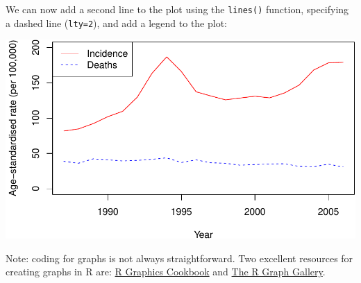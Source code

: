 \documentclass[
]{memoir}
\newenvironment{Shaded}{\begin{snugshade}}{\end{snugshade}}
\newcommand{\AttributeTok}[1]{\textcolor[rgb]{0.77,0.63,0.00}{#1}}
\newcommand{\DecValTok}[1]{\textcolor[rgb]{0.00,0.00,0.81}{#1}}
\newcommand{\FunctionTok}[1]{\textcolor[rgb]{0.00,0.00,0.00}{#1}}
\newcommand{\NormalTok}[1]{#1}
\newcommand{\SpecialCharTok}[1]{\textcolor[rgb]{0.00,0.00,0.00}{#1}}
\newcommand{\StringTok}[1]{\textcolor[rgb]{0.31,0.60,0.02}{#1}}
\begin{document}
We can now add a second line to the plot using the \texttt{lines()} function, specifying a dashed line (\texttt{lty=2}), and add a legend to the plot:

\begin{Shaded}
\end{Shaded}

\includegraphics{phcm9795-R-notes_files/figure-latex/unnamed-chunk-51-1.pdf}

Note: coding for graphs is not always straightforward. Two excellent resources for creating graphs in R are: \href{https://r-graphics.org/}{R Graphics Cookbook} and \href{https://r-graph-gallery.com/}{The R Graph Gallery}.
\end{document}
